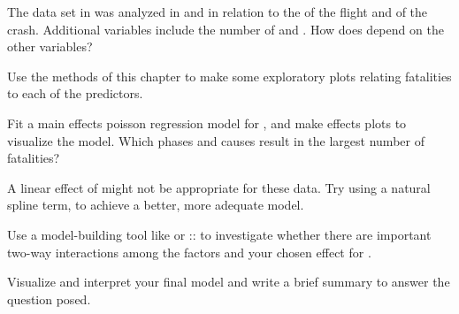 \documentclass[10pt]{report}\usepackage[]{graphicx}\usepackage[]{color}
\begin{document}
\begin{Exercises}
\begin{enumerate*}
   \end{enumerate*}

  \exercise The data set  in  was analyzed in  and 
  in relation to the  of the flight and  of the crash.  Additional variables include the number of 
   and .  How does  depend on the other variables?
  \begin{enumerate*}
    \item Use the methods of this chapter to make some exploratory plots relating fatalities to each of the predictors.
    \begin{ans}
    \end{ans}
    
    \item Fit a main effects poisson regression model for , and make effects plots to visualize the model.
    Which phases and causes result in the largest number of fatalities?
    \begin{ans}
    \end{ans}
    
    \item A linear effect of  might not be appropriate for these data.  Try using a natural spline term,
     to achieve a better, more adequate model.
    \begin{ans}
    \end{ans}
    
    \item Use a model-building tool like  or :: to investigate whether there
    are important two-way interactions among the factors and your chosen effect for .
    \begin{ans}
    \end{ans}
    
    \item Visualize and interpret your final model and write a brief summary to answer the 
    question posed.
    \begin{ans}
    \end{ans}
    
  \end{enumerate*}
  

\end{Exercises}
\end{document}
